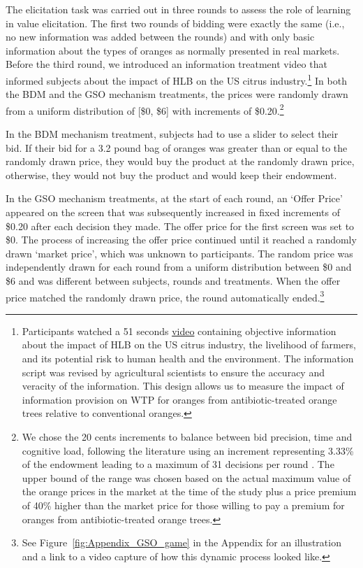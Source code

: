 \documentclass[12pt]{article}
\begin{document}
The elicitation task was carried out in three rounds to assess the role of learning \citep{corrigan2008testing, drichoutis2011role} in value elicitation. The first two rounds of bidding were exactly the same (i.e., no new information was added between the rounds) and with only basic information about the types of oranges as normally presented in real markets. Before the third round, we introduced an information treatment video that informed subjects about the impact of HLB on the US citrus industry.\footnote{Participants watched a 51 seconds \href{https://www.youtube.com/watch?v=_AqMBjB0ChM}{video} containing objective information about the impact of HLB on the US citrus industry, the livelihood of farmers, and its potential risk to human health and the environment. The information script was revised by agricultural scientists to ensure the accuracy and veracity of the information. This design allows us to measure the impact of information provision on WTP for oranges from antibiotic-treated orange trees relative to conventional oranges.} In both the BDM and the GSO mechanism treatments, the prices were randomly drawn from a uniform distribution of [\$0, \$6] with increments of \$0.20.\footnote{We chose the 20 cents increments to balance between bid precision, time and cognitive load, following the literature using an increment representing 3.33\% of the endowment leading to a maximum of 31 decisions per round \citep{li_obviously_2017, chakraborty_future_2025}. The upper bound of the range was chosen based on the actual maximum value of the orange prices in the market at the time of the study plus a price premium of 40\% higher than the market price for those willing to pay a premium for oranges from antibiotic-treated orange trees.}

In the BDM mechanism treatment, subjects had to use a slider to select their bid. If their bid for a 3.2 pound bag of oranges was greater than or equal to the randomly drawn price, they would buy the product at the randomly drawn price, otherwise, they would not buy the product and would keep their endowment.

In the GSO mechanism treatments, at the start of each round, an `Offer Price' appeared on the screen that was subsequently increased in fixed increments of \$0.20 after each decision they made. %
The offer price for the first screen was set to \$0. The process of increasing the offer price continued until it reached a randomly drawn `market price', which was unknown to participants. The random price was independently drawn for each round from a uniform distribution between \$0 and \$6 and was different between subjects, rounds and treatments. When the offer price matched the randomly drawn price, the round automatically ended.\footnote{See Figure~\ref{fig:Appendix_GSO_game} in the Appendix for an illustration and a link to a video capture of how this dynamic process looked like.} 
\end{document}
